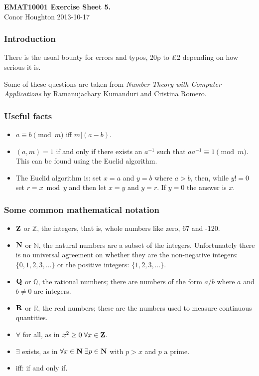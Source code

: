 \documentclass[12pt]{article}
\begin{document}
\begin{center}
{\bf EMAT10001 Exercise Sheet 5.}\\[1cm]{} Conor Houghton 2013-10-17
\end{center}
\subsubsection*{Introduction} 
There is the usual bounty for errors and typos, 20p to \pounds 2
depending on how serious it is.

Some of these questions are taken from \emph{Number Theory with
  Computer Applications} by Ramanujachary Kumanduri and Cristina
Romero.

\subsubsection*{Useful facts}
\begin{itemize}
\item $a\equiv b \pmod m$ iff $m|(a-b)$.
\item $(a,m)=1$ if and only if there exists an $a^{-1}$ such that $aa^{-1}\equiv 1 \pmod m$. This can be found using the Euclid algorithm.
\item The Euclid algorithm is: set $x=a$ and $y=b$ where $a>b$, then, while $y!=0$
  set $r=x\bmod y$ and then let $x=y$ and $y=r$. If $y=0$ the answer
  is $x$.
\end{itemize}
\subsubsection*{Some common mathematical notation}
\begin{itemize}
\item ${\bf Z}$ or $\mathbb{Z}$, the integers, that is, whole numbers like zero, 67 and -120.
\item ${\bf N}$ or $\mathbb{N}$, the natural numbers are a subset of
  the integers. Unfortunately there is no universal agreement on
  whether they are the non-negative integers: $\{0,1,2,3,\ldots\}$ or
  the positive integers: $\{1,2,3,\ldots\}$.
\item ${\bf Q}$ or $\mathbb{Q}$, the rational numbers; there are numbers of the form $a/b$ where $a$ and $b\not=0$ are integers.
\item ${\bf R}$ or $\mathbb{R}$, the real numbers; these are the numbers used to measure continuous quantities.
\item $\forall$ for all, as in $x^2\ge 0\;\forall x\in {\bf Z}$.
\item $\exists$ exists, as in $\forall x\in {\bf N}\;\exists p\in {\bf N}$ with $p>x$ and $p$ a prime.
\item iff: if and only if. 
\end{itemize}
\end{document}
